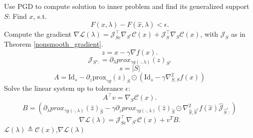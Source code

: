 \documentclass[11pt, twoside]{report}
\begin{document}
\begin{algorithm}[H] 
    Use PGD to compute solution to inner problem and find its generalized support $S$: Find $x$, s.t. 
    $$F(x,\lambda) - F(\hat{x},\lambda) < \epsilon.$$
    Compute the gradient $\nabla \mathcal{L}(\lambda)=\mathcal{J}_{S c }^{\top} \nabla_{S^c} \mathcal{C}(x)+\mathcal{J}_{S}^{\top} \nabla_{S} \mathcal{C}(x)$, with $\mathcal{J}_S$ as in Theorem  \ref{nonsmooth_gradient}.
    $$z = x - \gamma \nabla f(x).$$
    $$\mathcal{J}_{S^c:} = \partial_\lambda prox_{\gamma g(\cdot,\lambda)}(z)_{S^c}$$
    $$s = |S|$$
    $$A = \mathrm{Id}_s - \partial_z \mathrm{prox}_{\gamma g}(z)_S \odot (\mathrm{Id}_s - \gamma \nabla^2_{S,S} f(x))$$
    Solve the linear system up to tolerance $\epsilon$:
    $$A^\top v = \nabla_S \mathcal{C}(x).$$
    $$B = \left( \partial_\lambda prox_{\gamma g(\cdot,\lambda)}(\hat{z})_{\hat{S}} - \gamma \partial_z prox_{\gamma g(\cdot,\lambda)}(\hat{z})_{\hat{S}} \odot  \nabla^2_{\hat{S},\hat{S}^c} f(\hat{x}) \hat{\mathcal{J}}_{\hat{S}^c:}  \right)$$
    $$\nabla \mathcal{L}(\lambda) = \mathcal{J}_{S c }^{\top} \nabla_{S^c} \mathcal{C}(x) + v^T B.$$
    \Return $\mathcal{L}(\lambda) \triangleq \mathcal{C}(x)$,$\nabla \mathcal{L}(\lambda)$
  \caption{Active Set Identification + Outer Gradient Calculation} \label{alg:active_set}
 
\end{algorithm}
\end{document}
